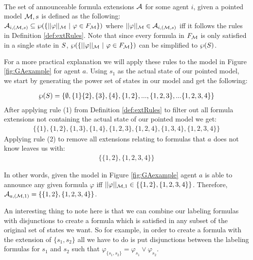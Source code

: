 \begin{definition}\hfill\\
	\label{def:annexts}
	The set of announceable formula extensions $\mathcal{A}_{}$ for some agent $i$, given a pointed model $\mathcal{M},s$ is defined 			as the following: \\
	$\mathcal{A}_{i,(\mathcal{M},s)} \subseteq \wp(\{||\varphi||_{\mathcal{M}} ~|~ \varphi\in F_{\mathcal{M}}\})$ where $||\varphi||_{\mathcal{M}} \in 		     
	\mathcal{A}_{i,(\mathcal{M},s)}$ iff it follows the rules in Definition \ref{def:extRules}.
	Note that since every formula in $F_{\mathcal{M}}$ is only satisfied in a single state in $S$, $\wp(\{||\varphi||_{\mathcal{M}} ~|~ \varphi \in F_{\mathcal{M}}\})$ can be simplified to $\wp(S)$.
\end{definition}

For a more practical explanation we will apply these rules to the model in Figure \ref{fig:GAexample} for agent $a$. Using $s_1$ as the actual state of our pointed model, we start by generating the power set of states in our model and get the following:

\begin{align*}
	\wp(S) = \{\emptyset,\{1\}\{2\},\{3\},\{4\},\{1,2\},...,\{1,2,3\},...\{1,2,3,4\}\}
\end{align*}
After applying rule (1) from Definition \ref{def:extRules}	to filter out all formula extensions not containing the actual state of our pointed model we get:
\begin{align*}
	\{\{1\},\{1,2\},\{1,3\},\{1,4\},\{1,2,3\},\{1,2,4\},\{1,3,4\},\{1,2,3,4\}\}
\end{align*}
Applying rule (2) to remove all extensions relating to formulas that $a$ does not know leaves us with:
\begin{align*}
	\{\{1,2\},\{1,2,3,4\}\}
\end{align*}

In other words, given the model in Figure \ref{fig:GAexample} agent $a$ is able to announce any given formula $\varphi$ iff $||\varphi||_{\mathcal{M},1} \in \{\{1,2\},\{1,2,3,4\}\}$. Therefore, $\mathcal{A}_{a,(\mathcal{M},1)} = \{\{1,2\},\{1,2,3,4\}\}$.

An interesting thing to note here is that we can combine our labeling formulas with disjunctions to create a formula which is satisfied in any subset of the original set of states we want. So for example, in order to create a formula with the extension of $\{s_1,s_2\}$ all we have to do is put disjunctions between the labeling formulas for $s_1$ and $s_2$ such that $\varphi_{\{s_1,s_2\}} = \varphi_{s_1} \vee \varphi_{s_2}$.

